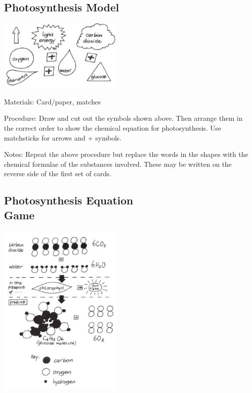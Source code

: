 \begin{multicols}{2}
\subsection{Photosynthesis Model} %

\begin{center}
\includegraphics[width=0.45\textwidth]{./img/vso/photo-model.jpg}
\end{center}

\begin{description*}
\item[Materials:]{Card/paper, matches}
\item[Procedure:]{Draw and cut out the symbols shown above. Then arrange them in the correct order to
show the chemical equation for photosynthesis. Use matchsticks for arrows and + symbols.}
\item[Notes:]{Repeat the above procedure but replace the words in the shapes with the chemical
formulae of the substances involved. These may be written on the reverse side of the first set
of cards.}
\end{description*}

\subsection[Photosynthesis Equation Game]{Photosynthesis Equation \hfill \\ Game} %

\begin{center}
\includegraphics[width=0.45\textwidth]{./img/vso/photo-game.jpg}
\end{center}


\end{multicols}
